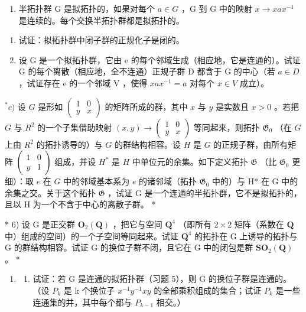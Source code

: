 \begin{enumerate}
\def\labelenumi{\arabic{enumi})}
\setcounter{enumi}{4}
\tightlist
\item
  半拓扑群 G 是拟拓扑的，如果对每个 \(a \in G\) ，G 到 G 中的映射 \(x \to xax^{-1}\) 是连续的。每个交换半拓扑群都是拟拓扑的。
\end{enumerate}

\begin{enumerate}
\def\labelenumi{\alph{enumi})}
\item
  试证：拟拓扑群中闭子群的正规化子是闭的。
\item
  设 G 是一个拟拓扑群，它由 e 的每个邻域生成（相应地，它是连通的）。试证 G 的每个离散（相应地，全不连通）正规子群 D 都含于 G 的中心（若 \(a \in D\) ，试证存在 e 的一个邻域 V ，使得 \(xax^{-1} = a\) 对每个 \(x \in V\) 成立）。
\end{enumerate}

\(^{*}c)\) 设 \(G\) 是形如 \(\begin{pmatrix} 1 & 0 \\ y & x \end{pmatrix}\) 的矩阵所成的群，其中 \(x\) 与 \(y\) 是实数且 \(x > 0\) 。若把 \(G\) 与 \(R^2\) 的一个子集借助映射 \((x, y) \to \begin{pmatrix} 1 & 0 \\ y & x \end{pmatrix}\) 等同起来，则拓扑 \(\mathfrak{G}_0\) （在 \(G\) 上由 \(R^2\) 的拓扑诱导的）与 \(G\) 的群结构相容。设 \(H\) 是 \(G\) 的正规子群，由所有矩阵 \(\begin{pmatrix} 1 & 0 \\ y & 1 \end{pmatrix}\) 组成，并设 \(H^*\) 是 \(H\) 中单位元的余集。如下定义拓扑 \(\mathfrak{G}\) （比 \(\mathfrak{G}_0\) 更细）：取 \(e\) 在 \(G\) 中的邻域基本系为 \(e\) 的诸邻域（拓扑 \(\mathfrak{G}_{0}\) 中的）与 H* 在 G 中的余集之交。关于这个拓扑 \(\mathfrak{G}\) ，试证 G 是一个连通的半拓扑群，它不是拟拓扑的，且以 H 为一个不含于中心的离散子群。 *

* 6) 设 G 是正交群 \(\mathbf{O}_{2}(\mathbf{Q})\) ，把它与空间 \(\mathbf{Q}^{4}\) （即所有 \(2 \times 2\) 矩阵（系数在 \(\mathbf{Q}\) 中）组成的空间）的一个子空间等同起来。试证 \(\mathbf{Q}^{4}\) 的拓扑在 G 上诱导的拓扑与 G 的群结构相容。试证 G 的换位子群不闭，且它在 G 中的闭包是群 \(\mathbf{SO}_{2}(\mathbf{Q})\) 。 *

\begin{enumerate}
\def\labelenumi{\arabic{enumi})}
\setcounter{enumi}{6}
\tightlist
\item
  \begin{enumerate}
  \def\labelenumii{\alph{enumii})}
  \tightlist
  \item
    试证：若 G 是连通的拟拓扑群（习题 5），则 G 的换位子群是连通的。（设 \(P_k\) 是 k 个换位子 \(x^{-1}y^{-1}xy\) 的全部乘积组成的集合；试证 \(P_k\) 是一些连通集的并，其中每个都与 \(P_{k-1}\) 相交。）
  \end{enumerate}
\end{enumerate}

